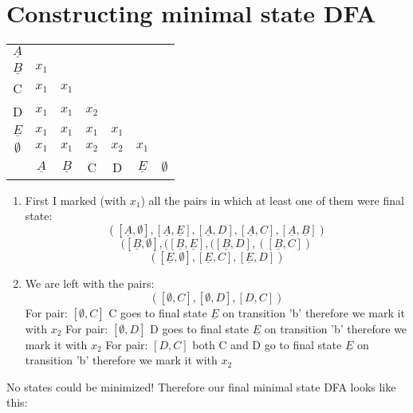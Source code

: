 \documentclass{report}[pt12]
\begin{document}
\section{Constructing minimal state DFA}

\begin{tabular}{|*{7}{c|}}
                               \cline{1-1}
  $\underline{A}$                     \\ \cline{1-2}
  $\underline{B}$ & $x_1$                 \\ \cline{1-3}
  C & $x_1$ & $x_1$           \\ \cline{1-4}
  D & $x_1$ & $x_1$ & $x_2$         \\ \cline{1-5}
  $\underline{E}$ & $x_1$ & $x_1$ & $x_1$ & $x_1$    \\ \cline{1-6}
  $\emptyset$ & $x_1$ & $x_1$ & $x_2$ & $x_2$ & $x_1$ \\ \hline
    & $\underline{A}$ & $\underline{B}$ & C & D & $\underline{E}$ & $\emptyset$ \\ \hline
\end{tabular}

\begin{enumerate}
  \item First I marked (with $x_1$) all the pairs in which at least one of them were final state:
  \[ ([\underline{A}, \emptyset], [\underline{A}, \underline{E}], [\underline{A}, D], [\underline{A}, C], [\underline{A}, \underline{B}]) \]
    \[ ([\underline{B}, \emptyset], ([\underline{B}, \underline{E}], ([\underline{B}, D], ([\underline{B}, C]) \]
    \[ ([\underline{E}, \emptyset], [\underline{E}, C], [\underline{E}, D])\]

  \item We are left with the pairs:
  \[ ([\emptyset , C], [\emptyset , D], [D , C] ) \]
  For pair: $ [\emptyset , C] $ C goes to final state $\underline{E}$ on transition 'b' therefore we mark it with $x_2$
  For pair: $ [\emptyset , D] $ D goes to final state $\underline{E}$ on transition 'b' therefore we mark it with $x_2$
  For pair: $ [D , C] $ both C and D go to final state $\underline{E}$ on transition 'b' therefore we mark it with $x_2$
\end{enumerate}

No states could be minimized! Therefore our final minimal state DFA looks like this:
\end{document}
